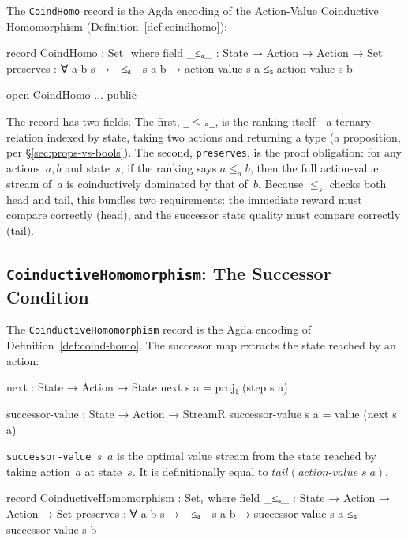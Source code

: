 \documentclass[runningheads]{llncs}
\begin{document}
The \texttt{CoindHomo} record is the Agda encoding of the Action-Value Coinductive Homomorphism (Definition~\ref{def:coindhomo}):

\begin{code}
  record CoindHomo : Set₁ where
    field
      _≤ₐ_      : State → Action → Action → Set
      preserves : ∀ a b s → _≤ₐ_ s a b →
                  action-value s a ≤ₛ action-value s b

  open CoindHomo {{...}} public
\end{code}

\noindent The record has two fields.  The first, \texttt{\_$\le$ₐ\_}, is the ranking itself---a ternary relation indexed by state, taking two actions and returning a type (a proposition, per \S\ref{sec:props-vs-bools}).  The second, \texttt{preserves}, is the proof obligation: for any actions~$a, b$ and state~$s$, if the ranking says $a \le_a b$, then the full action-value stream of~$a$ is coinductively dominated by that of~$b$.  Because $\le_s$ checks both head and tail, this bundles two requirements: the immediate reward must compare correctly (head), and the successor state quality must compare correctly (tail).

\subsection{\texttt{CoinductiveHomomorphism}: The Successor Condition}

The \texttt{CoinductiveHomomorphism} record is the Agda encoding of Definition~\ref{def:coind-homo}.  The successor map extracts the state reached by an action:

\begin{code}
  next : State → Action → State
  next s a = proj₁ (step s a)

  successor-value : State → Action → StreamR
  successor-value s a = value (next s a)
\end{code}

\noindent \texttt{successor-value}~$s$~$a$ is the optimal value stream from the state reached by taking action~$a$ at state~$s$.  It is definitionally equal to $\mathit{tail}(\mathit{action\text{-}value}\;s\;a)$.

\begin{code}
  record CoinductiveHomomorphism : Set₁ where
    field
      _≤ₐ_      : State → Action → Action → Set
      preserves : ∀ a b s → _≤ₐ_ s a b →
                  successor-value s a ≤ₛ successor-value s b
\end{code}
\end{document}
